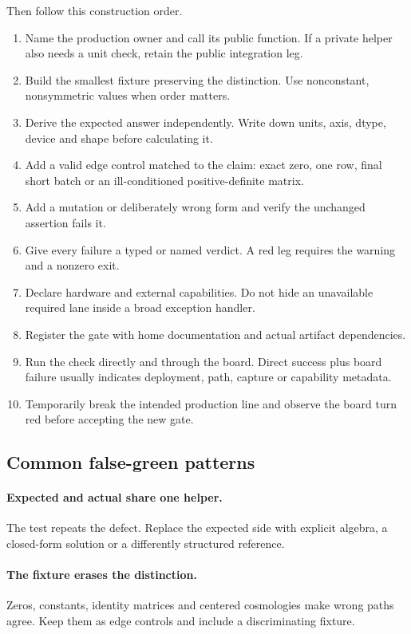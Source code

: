 \documentclass[10pt,aps,prd,twocolumn,nofootinbib]{revtex4-2}
\begin{document}
Then follow this construction order.
\begin{enumerate}
  \item Name the production owner and call its public function.  If a private
        helper also needs a unit check, retain the public integration leg.
  \item Build the smallest fixture preserving the distinction.  Use
        nonconstant, nonsymmetric values when order matters.
  \item Derive the expected answer independently.  Write down units, axis,
        dtype, device and shape before calculating it.
  \item Add a valid edge control matched to the claim: exact zero, one row,
        final short batch or an ill-conditioned positive-definite matrix.
  \item Add a mutation or deliberately wrong form and verify the unchanged
        assertion fails it.
  \item Give every failure a typed or named verdict.  A red leg requires the
        warning and a nonzero exit.
  \item Declare hardware and external capabilities.  Do not hide an
        unavailable required lane inside a broad exception handler.
  \item Register the gate with home documentation and actual artifact
        dependencies.
  \item Run the check directly and through the board.  Direct success plus
        board failure usually indicates deployment, path, capture or
        capability metadata.
  \item Temporarily break the intended production line and observe the board
        turn red before accepting the new gate.
\end{enumerate}

\subsection{Common false-green patterns}

\paragraph{Expected and actual share one helper.}
The test repeats the defect.  Replace the expected side with explicit algebra,
a closed-form solution or a differently structured reference.

\paragraph{The fixture erases the distinction.}
Zeros, constants, identity matrices and centered cosmologies make wrong paths
agree.  Keep them as edge controls and include a discriminating fixture.
\end{document}
